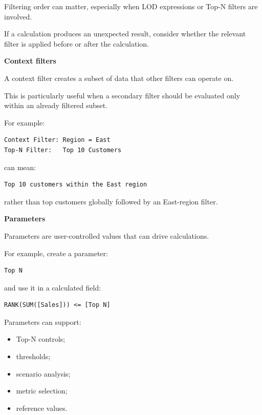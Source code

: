 \documentclass[11pt,letterpaper]{article}
\begin{document}
Filtering order can matter, especially when LOD expressions or Top-N filters
are involved.

If a calculation produces an unexpected result, consider whether the relevant
filter is applied before or after the calculation.



\textbf{Context filters}

A context filter creates a subset of data that other filters can operate on.

This is particularly useful when a secondary filter should be evaluated only
within an already filtered subset.

For example:

\begin{lstlisting}
Context Filter: Region = East
Top-N Filter:   Top 10 Customers
\end{lstlisting}

can mean:

\begin{lstlisting}
Top 10 customers within the East region
\end{lstlisting}

rather than top customers globally followed by an East-region filter.



\textbf{Parameters}

Parameters are user-controlled values that can drive calculations.

For example, create a parameter:

\begin{lstlisting}
Top N
\end{lstlisting}

and use it in a calculated field:

\begin{lstlisting}
RANK(SUM([Sales])) <= [Top N]
\end{lstlisting}

Parameters can support:

\begin{itemize}[leftmargin=*]
    \item Top-N controls;
    \item thresholds;
    \item scenario analysis;
    \item metric selection;
    \item reference values.
\end{itemize}
\end{document}
